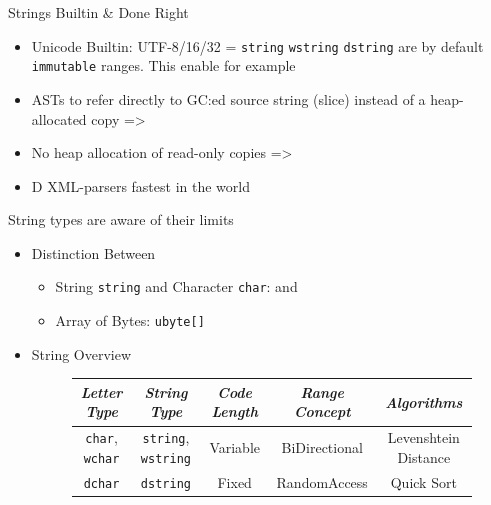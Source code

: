 \documentclass[xcolor=dvipsnames]{beamer}
\begin{document}
\begin{frame}[fragile]{Strings Builtin \& Done Right}
  \begin{itemize}[<+->]
  \item Unicode Builtin: UTF-8/16/32 = \texttt{string} \texttt{wstring}
    \texttt{dstring} are by default \texttt{immutable} ranges. This enable for
    example
  \item ASTs to refer directly to GC:ed source string (slice) instead of a
    heap-allocated copy =>
  \item No heap allocation of read-only copies =>
  \item D XML-parsers fastest in the world
  \end{itemize}
\end{frame}

\begin{frame}[fragile]{String types are aware of their limits}
  \begin{itemize}[<+->]
  \item Distinction Between
    \begin{itemize}[<+->]
    \item String \texttt{string} and Character \texttt{char}:  and
    \item Array of Bytes: \texttt{ubyte[]}
    \end{itemize}
  \item String Overview
  \begin{figure}
  \tiny
  \begin{tabular}{ c | c | c | c | c }
    \textit{Letter Type} & \textit{String Type} & \textit{Code Length} & \textit{Range Concept} & \textit{Algorithms} \\
    \hline
    \texttt{char}, \texttt{wchar} & \texttt{string}, \texttt{wstring} & Variable & BiDirectional & Levenshtein Distance\\
    \hline
    \texttt{dchar} & \texttt{dstring} & Fixed & RandomAccess & Quick Sort\\
  \end{tabular}
  \end{figure}
  \end{itemize}
\end{frame}
\end{document}

